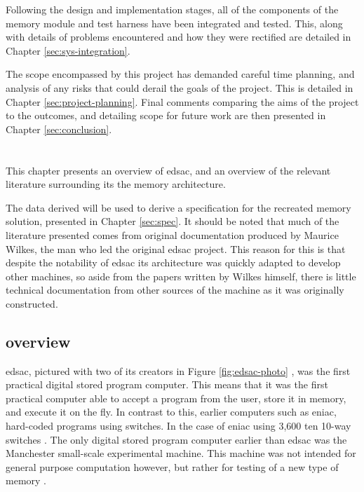 Following the design and implementation stages, all of the components of the memory module and test harness have been integrated and tested. This, along with details of problems encountered and how they were rectified are detailed in Chapter \ref{sec:sys-integration}.

The scope encompassed by this project has demanded careful time planning, and analysis of any risks that could derail the goals of the project. This is detailed in Chapter \ref{sec:project-planning}. Final comments comparing the aims of the project to the outcomes, and detailing scope for future work are then presented in Chapter \ref{sec:conclusion}.

\chapter{} \label{sec:tech-rev}
This chapter presents an overview of \gls{edsac}, and an overview of the relevant literature surrounding its the memory architecture.

The data derived will be used to derive a specification for the recreated memory solution, presented in Chapter \ref{sec:spec}. It should be noted that much of the literature presented comes from original documentation produced by Maurice Wilkes, the man who led the original \gls{edsac} project. This reason for this is that despite the notability of \gls{edsac} its architecture was quickly adapted to develop other machines, so aside from the papers written by Wilkes himself, there is little technical documentation from other sources of the machine as it was originally constructed.

\section{ overview} \label{sec:edsac-overview}
\Gls{edsac}, pictured with two of its creators in Figure \ref{fig:edsac-photo} \cite{cam2011}, was the first practical digital stored program computer. This means that it was the first practical computer able to accept a program from the user, store it in memory, and execute it on the fly. In contrast to this, earlier computers such as \gls{eniac}, hard-coded programs using switches. In the case of \gls{eniac} using 3,600 ten 10-way switches \cite{cruz2013}. The only digital stored program computer earlier than \gls{edsac} was the Manchester small-scale experimental machine. This machine was not intended for general purpose computation however, but rather for testing of a new type of memory \cite{jones2001}.

